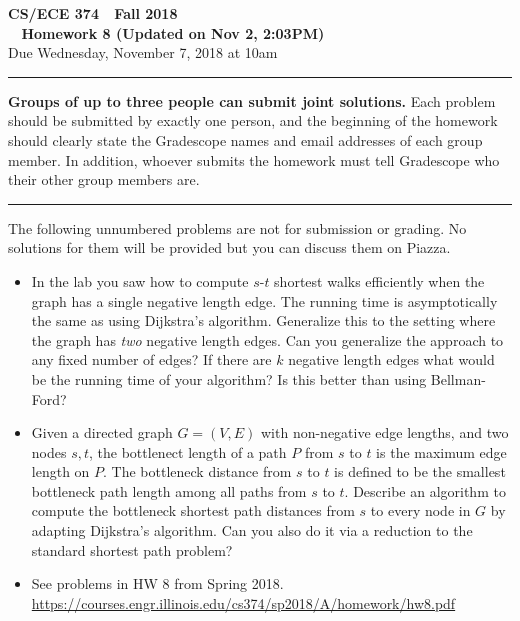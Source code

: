 \documentclass[11pt]{article}
\begin{document}

\thispagestyle{empty}

\begin{center}
\Large\textbf{CS/ECE 374 \,\decosix\,  Fall 2018}%
\\
\LARGE\textbf{\decothreeleft~ Homework 8 (Updated on Nov 2, 2:03PM) ~\decothreeright}%
\\[0.5ex]
\large Due Wednesday, November 7, 2018 at 10am
\end{center}

\bigskip
\hrule
\bigskip

\noindent
\textbf{Groups of up to three people can submit joint solutions.}
Each problem should be submitted by exactly one person, and the
beginning of the homework should clearly state the Gradescope names
and email addresses of each group member.  In addition, whoever
submits the homework must tell Gradescope who their other group
members are.
\bigskip \hrule \bigskip

\noindent
The following unnumbered problems are not for submission or grading.
No solutions for them will be provided but you can discuss them on Piazza.
\begin{itemize}
\item In the lab you saw how to compute $s$-$t$ shortest walks
efficiently when the graph has a single negative length edge. The running
time is asymptotically the same as using Dijkstra's algorithm. Generalize
this to the setting where the graph has {\em two} negative length edges.
Can you generalize the approach to any fixed number of edges? If there
are $k$ negative length edges what would be the running time of your
algorithm? Is this better than using Bellman-Ford?

\item Given a directed graph $G=(V,E)$ with non-negative edge lengths,
and two nodes $s,t$, the bottlenect length of a path $P$ from
$s$ to $t$ is the maximum edge length on $P$. The bottleneck distance
from $s$ to $t$ is defined to be the smallest bottleneck path length
among all paths from $s$ to $t$. Describe an algorithm to compute
the bottleneck shortest path distances from $s$ to every node in $G$
by adapting Dijkstra's algorithm. Can you also do it via a reduction
to the standard shortest path problem?

\item See problems in HW 8 from Spring 2018. \url{https://courses.engr.illinois.edu/cs374/sp2018/A/homework/hw8.pdf}
\end{itemize}
\end{document}

